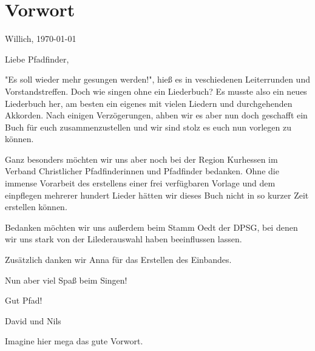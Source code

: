 \section*{Vorwort}

\begin{flushright} 
Willich, \today
\end{flushright}

Liebe Pfadfinder,

"Es soll wieder mehr gesungen werden!", hieß es in veschiedenen Leiterrunden und Vorstandstreffen. 
Doch wie singen ohne ein Liederbuch? 
Es musste also ein neues Liederbuch her, am besten ein eigenes mit vielen Liedern und durchgehenden Akkorden.
Nach einigen Verzögerungen, ahben wir es aber nun doch geschafft ein Buch für euch zusammenzustellen und 
wir sind stolz es euch nun vorlegen zu können.

Ganz besonders möchten wir uns aber noch bei der Region Kurhessen im Verband Christlicher Pfadfinderinnen und Pfadfinder bedanken.
Ohne die immense Vorarbeit des erstellens einer frei verfügbaren \latex Vorlage und dem einpflegen mehrerer hundert Lieder 
hätten wir dieses Buch nicht in so kurzer Zeit erstellen können.

Bedanken möchten wir uns außerdem beim Stamm Oedt der DPSG, bei denen wir uns stark von der Lilederauswahl haben beeinflussen lassen.

Zusätzlich danken wir Anna für das Erstellen des Einbandes.

Nun aber viel Spaß beim Singen!

Gut Pfad!

David und Nils

Imagine hier mega das gute Vorwort.